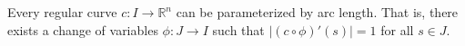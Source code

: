 Every regular curve $c: I \to \mathbb{R}^n$ can be parameterized by arc length. That is, there exists a change of variables $\phi: J \to I$ such that $|(c \circ \phi)'(s)| = 1$ for all $s \in J$.